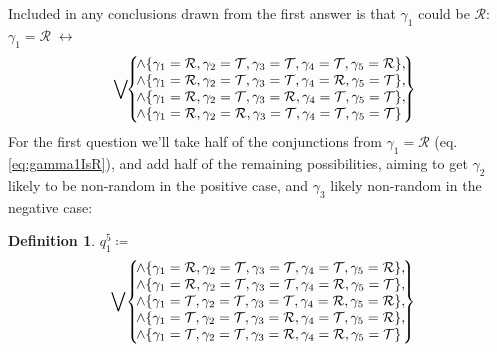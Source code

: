 \documentclass[twoside,twocolumn,a4paper,11pt]{article}
\theoremstyle{definition}
\newtheorem{defn}[theorem]{Definition}
\begin{document}
Included in any conclusions drawn from the first answer is that $\gamma_1$ could be $\mathcal{R}$:
$\gamma_1\!=\!\mathcal{R} \;\leftrightarrow$
\begin{equation}
\label{eq:gamma1IsR}
\bigvee\!\!
 \left\lbrace\!
  \begin{matrix}
   \land\{\gamma_1=\mathcal{R},\gamma_2=\mathcal{T},\gamma_3=\mathcal{T},\gamma_4=\mathcal{T},
   \gamma_5=\mathcal{R}\},\\
   \land\{\gamma_1=\mathcal{R},\gamma_2=\mathcal{T},\gamma_3=\mathcal{T},\gamma_4=\mathcal{R},
   \gamma_5=\mathcal{T}\},\vspace{0pt}\\
   \land\{\gamma_1=\mathcal{R},\gamma_2=\mathcal{T},\gamma_3=\mathcal{R},\gamma_4=\mathcal{T},
   \gamma_5=\mathcal{T}\},\\
   \land\{\gamma_1=\mathcal{R},\gamma_2=\mathcal{R},\gamma_3=\mathcal{T},\gamma_4=\mathcal{T},
   \gamma_5=\mathcal{T}\}\;\\
  \end{matrix}\!
 \right\rbrace\!\!\!\!
\end{equation}
For the first question we'll take half of the conjunctions from
$\gamma_1=\mathcal{R}$ (eq.\,\eqref{eq:gamma1IsR}), 
and add half of the remaining possibilities,
aiming to get $\gamma_2$ likely to be non-random in the positive case,
and $\gamma_3$ likely non-random in the negative case:
\begin{defn}%
\label{def:q15}
$q_1^5\coloneqq$
\begin{equation}
\label{eq:q15}
\bigvee\!
 \left\lbrace\!
  \begin{matrix}
   \land\{\gamma_1=\mathcal{R},\gamma_2=\mathcal{T},\gamma_3=\mathcal{T},\gamma_4=\mathcal{T},
   \gamma_5=\mathcal{R}\},\\
   \land\{\gamma_1=\mathcal{R},\gamma_2=\mathcal{T},\gamma_3=\mathcal{T},\gamma_4=\mathcal{R},
   \gamma_5=\mathcal{T}\},\\
   \land\{\gamma_1=\mathcal{T},\gamma_2=\mathcal{T},\gamma_3=\mathcal{T},\gamma_4=\mathcal{R},
   \gamma_5=\mathcal{R}\},\vspace{0pt}\\
   \land\{\gamma_1=\mathcal{T},\gamma_2=\mathcal{T},\gamma_3=\mathcal{R},\gamma_4=\mathcal{T},
   \gamma_5=\mathcal{R}\},\\
   \land\{\gamma_1=\mathcal{T},\gamma_2=\mathcal{T},\gamma_3=\mathcal{R},\gamma_4=\mathcal{R},
   \gamma_5=\mathcal{T}\}\;\\
  \end{matrix}\!
 \right\rbrace\!\!\!
\end{equation}
\end{defn}
\end{document}
